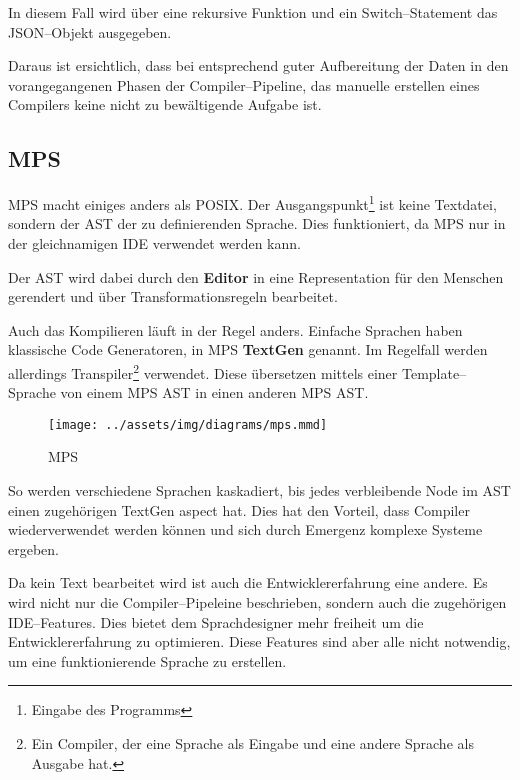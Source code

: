 In diesem Fall wird über eine rekursive Funktion und ein Switch--Statement das \acs{JSON}--Objekt ausgegeben.

Daraus ist ersichtlich, dass bei entsprechend guter Aufbereitung der Daten in den vorangegangenen Phasen der Compiler--Pipeline, das manuelle erstellen eines Compilers keine nicht zu bewältigende Aufgabe ist.

\subsection{\acl{MPS}}\label{subsec:meta-programming-system}
\ac{MPS} macht einiges anders als \ac{POSIX}.
Der Ausgangspunkt\footnote{Eingabe des Programms} ist keine Textdatei, sondern der \ac{AST} der zu definierenden Sprache.
Dies funktioniert, da \ac{MPS} nur in der gleichnamigen \ac{IDE} verwendet werden kann.

Der \ac{AST} wird dabei durch den \textbf{Editor} in eine Representation für den Menschen gerendert und über Transformationsregeln bearbeitet.

Auch das Kompilieren läuft in der Regel anders.
Einfache Sprachen haben klassische Code Generatoren, in \ac{MPS} \textbf{TextGen} genannt.
Im Regelfall werden allerdings Transpiler\footnote{Ein Compiler, der eine Sprache als Eingabe und eine andere Sprache als Ausgabe hat.} verwendet.
Diese übersetzen mittels einer Template--Sprache von einem \ac{MPS} \ac{AST} in einen anderen \ac{MPS} \ac{AST}.

\begin{wrapfigure}{lH}{0.5\textwidth}
    \begin{center}
        \texttt{[image: ../assets/img/diagrams/mps.mmd]}
    \end{center}
    \caption{\acs{MPS} }
    \label{fig:mps-compiler-pipeline}
\end{wrapfigure}

So werden verschiedene Sprachen kaskadiert, bis jedes verbleibende Node im \ac{AST} einen zugehörigen TextGen aspect hat.
Dies hat den Vorteil, dass Compiler wiederverwendet werden können und sich durch Emergenz komplexe Systeme ergeben.

Da kein Text bearbeitet wird ist auch die Entwicklererfahrung eine andere.
Es wird nicht nur die Compiler--Pipeleine beschrieben, sondern auch die zugehörigen \acs{IDE}--Features.
Dies bietet dem Sprachdesigner mehr freiheit um die Entwicklererfahrung zu optimieren.
Diese Features sind aber alle nicht notwendig, um eine funktionierende Sprache zu erstellen.

